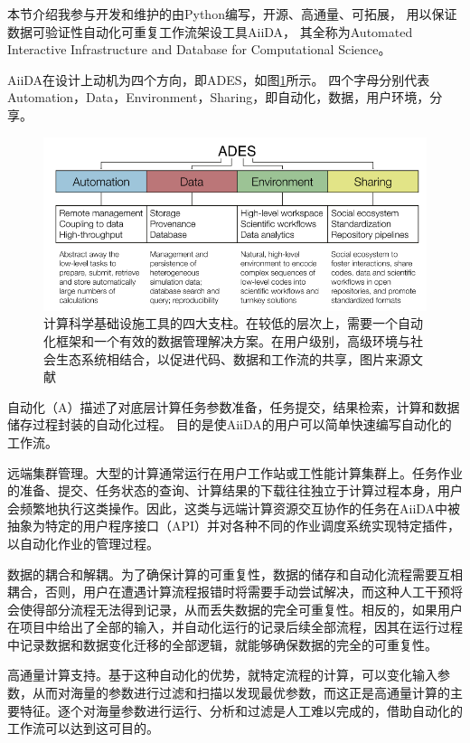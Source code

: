 本节介绍我参与开发和维护的由Python编写，开源、高通量、可拓展，
用以保证数据可验证性自动化可重复工作流架设工具AiiDA\cite{pizzi2016aiida,huber2020aiida}，
其全称为Automated Interactive Infrastructure and Database for Computational Science。

AiiDA在设计上动机为四个方向，即ADES，如图\ref{fig:ch3_ades}所示。
四个字母分别代表Automation，Data，Environment，Sharing，即自动化，数据，用户环境，分享。

\begin{figure}
  \includegraphics[width=1.0\textwidth]{figs/ch3_ades.png}
  \centering
  \caption{计算科学基础设施工具的四大支柱。在较低的层次上，需要一个自动化框架和一个有效的数据管理解决方案。在用户级别，高级环境与社会生态系统相结合，以促进代码、数据和工作流的共享，图片来源文献\cite{pizzi2016aiida}}
  \label{fig:ch3_ades}
\end{figure}

自动化（A）描述了对底层计算任务参数准备，任务提交，结果检索，计算和数据储存过程封装的自动化过程。 目的是使AiiDA的用户可以简单快速编写自动化的工作流。
\begin{alphaenum}
    \item 远端集群管理。大型的计算通常运行在用户工作站或工性能计算集群上。任务作业的准备、提交、任务状态的查询、计算结果的下载往往独立于计算过程本身，用户会频繁地执行这类操作。因此，这类与远端计算资源交互协作的任务在AiiDA中被抽象为特定的用户程序接口（API）并对各种不同的作业调度系统实现特定插件，以自动化作业的管理过程。
    \item 数据的耦合和解耦。为了确保计算的可重复性，数据的储存和自动化流程需要互相耦合，否则，用户在遭遇计算流程报错时将需要手动尝试解决，而这种人工干预将会使得部分流程无法得到记录，从而丢失数据的完全可重复性。相反的，如果用户在项目中给出了全部的输入，并自动化运行的记录后续全部流程，因其在运行过程中记录数据和数据变化迁移的全部逻辑，就能够确保数据的完全的可重复性。
    \item 高通量计算支持。基于这种自动化的优势，就特定流程的计算，可以变化输入参数，从而对海量的参数进行过滤和扫描以发现最优参数，而这正是高通量计算的主要特征。逐个对海量参数进行运行、分析和过滤是人工难以完成的，借助自动化的工作流可以达到这可目的。
\end{alphaenum}

